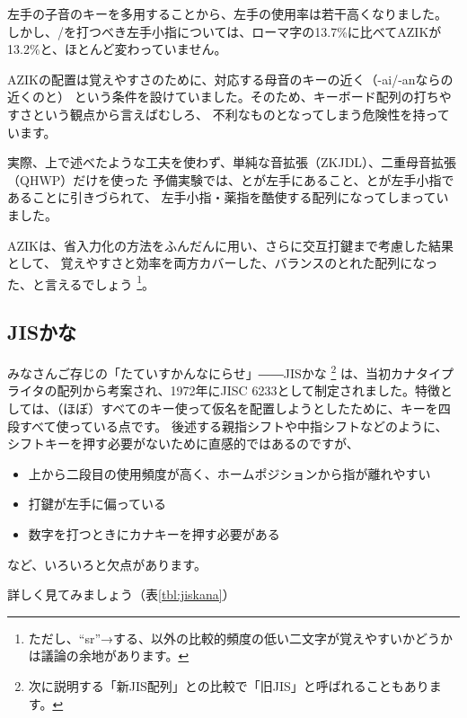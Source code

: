 左手の子音のキーを多用することから、左手の使用率は若干高くなりました。
しかし、/を打つべき左手小指については、ローマ字の13.7\%に比べてAZIKが13.2\%と、ほとんど変わっていません。

AZIKの配置は覚えやすさのために、対応する母音のキーの近く（-ai/-anならの近くのと）
という条件を設けていました。そのため、キーボード配列の打ちやすさという観点から言えばむしろ、
不利なものとなってしまう危険性を持っています。

実際、上で述べたような工夫を使わず、単純な音拡張（ZKJDL）、二重母音拡張（QHWP）だけを使った
予備実験では、とが左手にあること、とが左手小指であることに引きづられて、
左手小指・薬指を酷使する配列になってしまっていました。

AZIKは、省入力化の方法をふんだんに用い、さらに交互打鍵まで考慮した結果として、
覚えやすさと効率を両方カバーした、バランスのとれた配列になった、と言えるでしょう%
\footnote{ただし、``sr''→する、以外の比較的頻度の低い二文字が覚えやすいかどうかは議論の余地があります。}。


\subsection{JISかな}

みなさんご存じの「たていすかんなにらせ」――JISかな%
\footnote{次に説明する「新JIS配列」との比較で「旧JIS」と呼ばれることもあります。}%
は、当初カナタイプライタの配列から考案され、1972年にJISC 6233として制定されました。特徴としては、（ほぼ）すべてのキー使って仮名を配置しようとしたために、キーを四段すべて使っている点です。
後述する親指シフトや中指シフトなどのように、シフトキーを押す必要がないために直感的ではあるのですが、
\begin{itemize}
\item 上から二段目の使用頻度が高く、ホームポジションから指が離れやすい
\item 打鍵が左手に偏っている
\item 数字を打つときにカナキーを押す必要がある
\end{itemize}
など、いろいろと欠点があります。

詳しく見てみましょう（表\ref{tbl:jiskana}）

